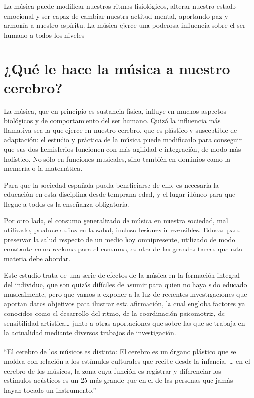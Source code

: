 \documentclass{bmcart}
\begin{document}
La música puede modificar nuestros ritmos fisiológicos, alterar nuestro estado emocional y ser capaz de cambiar nuestra actitud mental, aportando paz y armonía a nuestro espíritu. La música ejerce una poderosa influencia sobre el ser humano a todos los niveles.
\section*{¿Qué le hace la música a nuestro cerebro?}
La música, que en principio es sustancia física, influye en muchos   aspectos biológicos y de comportamiento del ser humano. Quizá la influencia más llamativa sea la que ejerce en nuestro cerebro, que es plástico y susceptible de adaptación: el estudio y práctica de la música puede modificarlo para conseguir que sus dos hemisferios funcionen con más agilidad e integración, de modo más holístico. No sólo en funciones musicales, sino también en dominios como la memoria o la matemática.

Para que la sociedad española pueda beneficiarse de ello, es  necesaria la educación en esta disciplina desde temprana edad, y el lugar idóneo para que llegue a todos es la enseñanza obligatoria.

Por otro lado, el consumo generalizado de música en nuestra sociedad, mal utilizado, produce daños en la salud, incluso lesiones irreversibles. Educar para preservar la salud respecto de un medio hoy omnipresente, utilizado de modo constante como reclamo para el consumo, es otra de las grandes tareas que esta materia debe abordar.

Este estudio trata de una serie de efectos de la música en la formación integral del individuo, que son quizás difíciles de asumir para quien no haya sido educado musicalmente, pero que vamos a exponer a la luz de recientes investigaciones que aportan datos objetivos para ilustrar esta afirmación, la cual engloba factores ya conocidos como el desarrollo del ritmo, de la coordinación psicomotriz, de  sensibilidad artística… junto a otras aportaciones que sobre las que se trabaja en la actualidad mediante diversos trabajos de investigación.
\paragraph*{ }
“El cerebro de los músicos es distinto: El cerebro es un órgano plástico que se moldea con relación a los estímulos culturales que recibe desde la infancia. … en el cerebro de los músicos, la zona cuya función es registrar y diferenciar los estímulos acústicos es un 25 más grande que en el de las personas que jamás hayan tocado un instrumento.”
\end{document}
